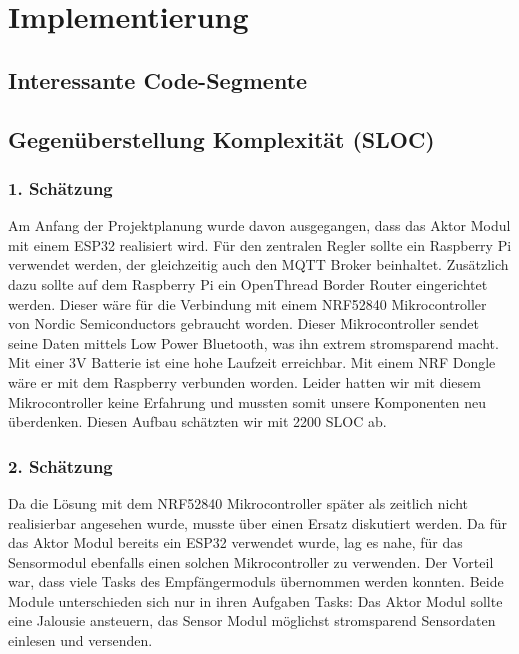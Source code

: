 \chapter{Implementierung}
\label{cha:Implementierung}

\section{Interessante Code-Segmente}

\section{Gegenüberstellung Komplexität (SLOC)}
\subsection{1. Schätzung}
Am Anfang der Projektplanung wurde davon ausgegangen, dass das Aktor Modul mit einem ESP32 realisiert wird. Für den zentralen Regler sollte ein Raspberry Pi verwendet werden, der gleichzeitig auch den MQTT Broker beinhaltet. Zusätzlich dazu sollte auf dem Raspberry Pi ein OpenThread Border Router eingerichtet werden. Dieser wäre für die Verbindung mit einem NRF52840 Mikrocontroller von Nordic Semiconductors gebraucht worden. Dieser Mikrocontroller sendet seine Daten mittels Low Power Bluetooth, was ihn extrem stromsparend macht. Mit einer 3V Batterie ist eine hohe Laufzeit erreichbar. Mit einem NRF Dongle wäre er mit dem Raspberry verbunden worden. Leider hatten wir mit diesem Mikrocontroller keine Erfahrung und mussten somit unsere Komponenten neu überdenken. Diesen Aufbau schätzten wir mit 2200 SLOC ab.
\subsection{2. Schätzung}
\label{cha:projektplanung_2schaetzung}
Da die Lösung mit dem NRF52840 Mikrocontroller später als zeitlich nicht realisierbar angesehen wurde, musste über einen Ersatz diskutiert werden. Da für das Aktor Modul bereits ein ESP32 verwendet wurde, lag es nahe, für das Sensormodul ebenfalls einen solchen Mikrocontroller zu verwenden. Der Vorteil war, dass viele Tasks des Empfängermoduls übernommen werden konnten. Beide Module unterschieden sich nur in ihren Aufgaben Tasks: Das Aktor Modul sollte eine Jalousie ansteuern, das Sensor Modul möglichst stromsparend Sensordaten einlesen und versenden.
